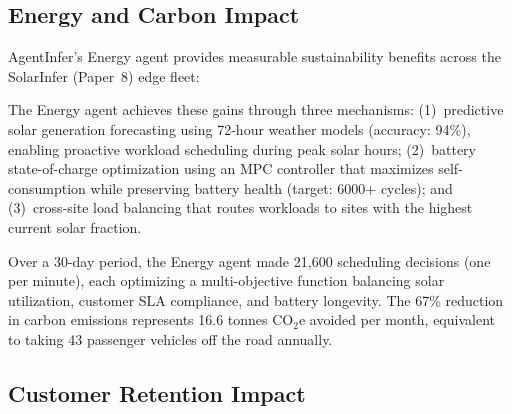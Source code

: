 \documentclass[conference,10pt,letterpaper]{IEEEtran}
\begin{document}
\subsection{Energy and Carbon Impact}

AgentInfer's Energy agent provides measurable sustainability benefits across the SolarInfer (Paper~8) edge fleet:

\begin{table}[!t]
\caption{Energy Agent Optimization Results (30-day)}
\label{tab:energy}
\centering\scriptsize
{}
\end{table}

The Energy agent achieves these gains through three mechanisms: (1)~predictive solar generation forecasting using 72-hour weather models (accuracy: 94\%), enabling proactive workload scheduling during peak solar hours; (2)~battery state-of-charge optimization using an MPC controller that maximizes self-consumption while preserving battery health (target: 6000+ cycles); and (3)~cross-site load balancing that routes workloads to sites with the highest current solar fraction.

Over a 30-day period, the Energy agent made 21,600 scheduling decisions (one per minute), each optimizing a multi-objective function balancing solar utilization, customer SLA compliance, and battery longevity. The 67\% reduction in carbon emissions represents 16.6 tonnes CO$_2$e avoided per month, equivalent to taking 43 passenger vehicles off the road annually.

\subsection{Customer Retention Impact}
\end{document}

